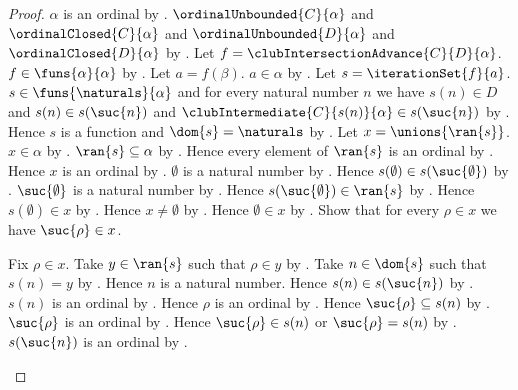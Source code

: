 \begin{proof}
    $\alpha$ is an ordinal by .
    $\ordinalUnbounded{C}{\alpha}$ and
        $\ordinalClosed{C}{\alpha}$ and
        $\ordinalUnbounded{D}{\alpha}$ and
        $\ordinalClosed{D}{\alpha}$
        by .
    Let $f=\clubIntersectionAdvance{C}{D}{\alpha}$.
    $f\in\funs{\alpha}{\alpha}$
        by .
    Let $a=f(\beta)$.
    $a\in\alpha$ by .
    Let $s=\iterationSet{f}{a}$.
    $s\in\funs{\naturals}{\alpha}$ and
        for every natural number $n$ we have
            $s(n)\in D$ and $s(n)\in s(\suc{n})$ and
            $\clubIntermediate{C}{s(n)}{\alpha}\in s(\suc{n})$
        by .
    Hence $s$ is a function and $\dom{s}=\naturals$
        by .
    Let $x=\unions{\ran{s}}$.
    $x\in\alpha$ by .
    $\ran{s}\subseteq\alpha$ by .
    Hence every element of $\ran{s}$ is an ordinal
        by .
    Hence $x$ is an ordinal by .
    $\emptyset$ is a natural number by .
    Hence $s(\emptyset)\in s(\suc{\emptyset})$
        by .
    $\suc{\emptyset}$ is a natural number by .
    Hence $s(\suc{\emptyset})\in\ran{s}$ by .
    Hence $s(\emptyset)\in x$ by .
    Hence $x\neq\emptyset$ by .
    Hence $\emptyset\in x$
        by .
    Show that for every $\rho\in x$ we have $\suc{\rho}\in x$.
    \begin{subproof}
        Fix $\rho\in x$.
        Take $y\in\ran{s}$ such that $\rho\in y$
            by .
        Take $n\in\dom{s}$ such that $s(n)=y$
            by .
        Hence $n$ is a natural number.
        Hence $s(n)\in s(\suc{n})$
            by .
        $s(n)$ is an ordinal
            by .
        Hence $\rho$ is an ordinal by .
        Hence $\suc{\rho}\subseteq s(n)$
            by .
        $\suc{\rho}$ is an ordinal by .
        Hence $\suc{\rho}\in s(n)$ or $\suc{\rho}=s(n)$
            by .
        $s(\suc{n})$ is an ordinal
            by .

\end{subproof}
\end{proof}
